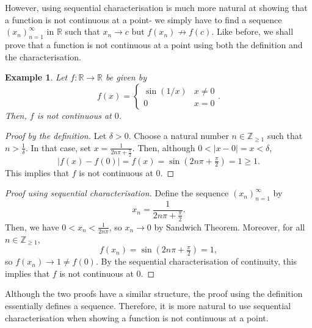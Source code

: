 \documentclass[a4paper, openany]{memoir}
\theoremstyle{definition}
\theoremstyle{plain}
\newtheorem{example}[definition]{Example}
\begin{document}
However, using sequential characterisation is much more natural at showing that a function is not continuous at a point- we simply have to find a sequence $(x_n)_{n=1}^{\infty}$ in $\mathbb{R}$ such that $x_n \to c$ but $f(x_n) \not\to f(c)$. Like before, we shall prove that a function is not continuous at a point using both the definition and the characterisation.
\begin{example}
Let $f: \mathbb{R} \to \mathbb{R}$ be given by
\[f(x) = \begin{cases}
\sin (1/x) & x \neq 0 \\
0 & x = 0
\end{cases}.\]
Then, $f$ is not continuous at $0$.
\end{example}
\begin{proof}[Proof by the definition]
Let $\delta > 0$. Choose a natural number $n \in \mathbb{Z}_{\geqslant 1}$ such that $n > \frac{1}{\delta}$. In that case, set $x = \frac{1}{2n\pi + \frac{\pi}{2}}$. Then, although $0 < |x - 0| = x < \delta$, 
\[|f(x) - f(0)| = f(x) = \sin(2n \pi + \tfrac{\pi}{2}) = 1 \geqslant 1.\]
This implies that $f$ is not continuous at $0$.
\end{proof}
\begin{proof}[Proof using sequential characterisation]
Define the sequence $(x_n)_{n=1}^{\infty}$ by 
\[x_n = \frac{1}{2n \pi + \frac{\pi}{2}}.\]
Then, we have $0 < x_n < \frac{1}{2n \pi}$, so $x_n \to 0$ by Sandwich Theorem. Moreover, for all $n \in \mathbb{Z}_{\geqslant 1}$,
\[f(x_n) = \sin (2n \pi + \tfrac{\pi}{2}) = 1,\]
so $f(x_n) \to 1 \neq f(0)$. By the sequential characterisation of continuity, this implies that $f$ is not continuous at $0$.
\end{proof}
\noindent Although the two proofs have a similar structure, the proof using the definition essentially defines a sequence. Therefore, it is more natural to use sequential characterisation when showing a function is not continuous at a point.
\end{document}
